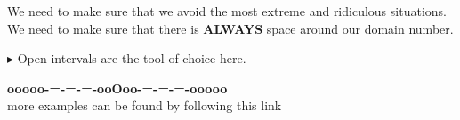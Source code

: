 \documentclass{ximera}
\begin{document}
We need to make sure that we avoid the most extreme and ridiculous situations.  We need to make sure that there is \textbf{\textcolor{red!70!black}{ALWAYS}} space around our domain number.



\textbf{\textcolor{red!70!darkgray}{$\blacktriangleright$}} Open intervals are the tool of choice here.













\begin{onlineOnly}
\begin{center}
\textbf{\textcolor{green!50!black}{ooooo-=-=-=-ooOoo-=-=-=-ooooo}} \\

more examples can be found by following this link\\ 

\end{center}
\end{onlineOnly}
\end{document}
